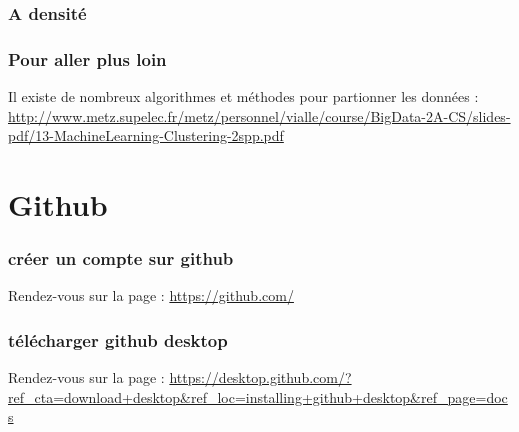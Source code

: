 \begin{frame}
  \frametitle{A densité}


  
\end{frame}

\begin{frame}
  \frametitle{Pour aller plus loin}

Il existe de nombreux algorithmes et méthodes pour partionner les données :
\url{http://www.metz.supelec.fr/metz/personnel/vialle/course/BigData-2A-CS/slides-pdf/13-MachineLearning-Clustering-2spp.pdf}

  
\end{frame}


\section{Github}
\begin{frame}
  \frametitle{créer un compte sur github}

Rendez-vous sur la page : \url{https://github.com/}
  
\end{frame}

\begin{frame}
  \frametitle{télécharger github desktop}

Rendez-vous sur la page : \url{https://desktop.github.com/?ref_cta=download+desktop&ref_loc=installing+github+desktop&ref_page=docs}
  
\end{frame}


